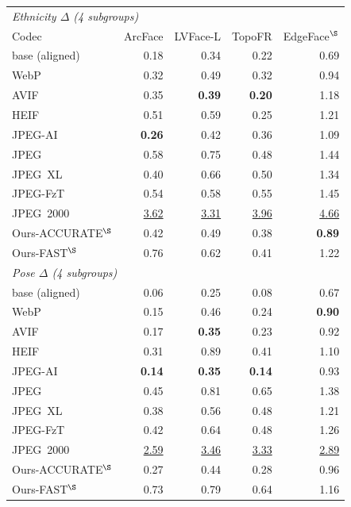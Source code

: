 \begin{tabular}{lrrrr}
\toprule
\multicolumn{5}{l}{\emph{Ethnicity $\Delta$ (4 subgroups)}}\\
Codec & ArcFace & LVFace-L & TopoFR & EdgeFace$^{\S}$ \\
\midrule
    base (aligned) & 0.18 & 0.34 & 0.22 & 0.69 \\
    WebP & 0.32 & 0.49 & 0.32 & 0.94 \\
    AVIF & 0.35 & \cellcolor{green!25}\textbf{0.39} & \cellcolor{green!25}\textbf{0.20} & 1.18 \\
    HEIF & 0.51 & 0.59 & 0.25 & 1.21 \\
    JPEG-AI & \cellcolor{green!25}\textbf{0.26} & 0.42 & 0.36 & 1.09 \\
    JPEG & 0.58 & 0.75 & 0.48 & 1.44 \\
    JPEG~XL & 0.40 & 0.66 & 0.50 & 1.34 \\
    JPEG-FzT & 0.54 & 0.58 & 0.55 & 1.45 \\
    JPEG~2000 & \cellcolor{red!22}\underline{3.62} & \cellcolor{red!22}\underline{3.31} & \cellcolor{red!22}\underline{3.96} & \cellcolor{red!22}\underline{4.66} \\
    Ours-ACCURATE$^{\S}$ & 0.42 & 0.49 & 0.38 & \cellcolor{green!25}\textbf{0.89} \\
    Ours-FAST$^{\S}$ & 0.76 & 0.62 & 0.41 & 1.22 \\
\midrule
\multicolumn{5}{l}{\emph{Pose $\Delta$ (4 subgroups)}}\\
    base (aligned) & 0.06 & 0.25 & 0.08 & 0.67 \\
    WebP & 0.15 & 0.46 & 0.24 & \cellcolor{green!25}\textbf{0.90} \\
    AVIF & 0.17 & \cellcolor{green!25}\textbf{0.35} & 0.23 & 0.92 \\
    HEIF & 0.31 & 0.89 & 0.41 & 1.10 \\
    JPEG-AI & \cellcolor{green!25}\textbf{0.14} & \cellcolor{green!25}\textbf{0.35} & \cellcolor{green!25}\textbf{0.14} & 0.93 \\
    JPEG & 0.45 & 0.81 & 0.65 & 1.38 \\
    JPEG~XL & 0.38 & 0.56 & 0.48 & 1.21 \\
    JPEG-FzT & 0.42 & 0.64 & 0.48 & 1.26 \\
    JPEG~2000 & \cellcolor{red!22}\underline{2.59} & \cellcolor{red!22}\underline{3.46} & \cellcolor{red!22}\underline{3.33} & \cellcolor{red!22}\underline{2.89} \\
    Ours-ACCURATE$^{\S}$ & 0.27 & 0.44 & 0.28 & 0.96 \\
    Ours-FAST$^{\S}$ & 0.73 & 0.79 & 0.64 & 1.16 \\
\bottomrule
\end{tabular}
